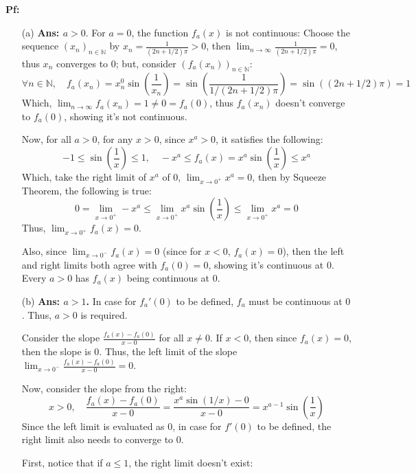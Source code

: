 \documentclass{article}
\begin{document}
\textbf{Pf:}

\begin{itemize}
    \item[(a)] \textbf{Ans: $a>0$}. For $a=0$, the function $f_a(x)$ is not continuous: Choose the sequence $(x_n)_{n\in\mathbb{N}}$ by $x_n=\frac{1}{(2n+1/2)\pi} >0$, 
    then $\lim_{n\rightarrow\infty}\frac{1}{(2n+1/2)\pi}=0$, thus $x_n$ converges to $0$; but, consider $(f_a(x_n))_{n\in\mathbb{N}}$:
    $$\forall n\in\mathbb{N},\quad f_a(x_n) = x_n^0\sin\left(\frac{1}{x_n}\right) = \sin\left(\frac{1}{1/(2n+1/2)\pi}\right) = \sin((2n+1/2)\pi) = 1$$
    Which, $\lim_{n\rightarrow\infty}f_a(x_n) = 1\neq 0 = f_a(0)$, thus $f_a(x_n)$ doesn't converge to $f_a(0)$, showing it's not continuous.
    
    \hfill

    Now, for all $a>0$, for any $x>0$, since $x^a>0$, it satisfies the following:
    $$-1\leq \sin\left(\frac{1}{x}\right)\leq 1,\quad -x^a\leq f_a(x)=x^a\sin\left(\frac{1}{x}\right)\leq x^a$$
    Which, take the right limit of $x^a$ of $0$, $\lim_{x\rightarrow 0^+}x^a=0$, then by Squeeze Theorem, the following is true:
    $$0 =\lim_{x\rightarrow 0^+}-x^a\leq \lim_{x\rightarrow 0^+}x^a\sin\left(\frac{1}{x}\right)\leq \lim_{x\rightarrow 0^+}x^a = 0$$
    Thus, $\lim_{x\rightarrow 0^+}f_a(x)=0$.

    Also, since $\lim_{x\rightarrow 0^-}f_a(x) = 0$ (since for $x<0$, $f_a(x)=0$), then the left and right limits both agree with $f_a(0)=0$, showing it's continuous at $0$.
    Every $a>0$ has $f_a(x)$ being continuous at $0$.
    
    \hfill

    \item[(b)] \textbf{Ans: $a>1$.} In case for $f_a'(0)$ to be defined, $f_a$ must be continuous at $0$. Thus, $a>0$ is required.
    
    Consider the slope $\frac{f_a(x)-f_a(0)}{x-0}$ for all $x\neq 0$.
    If $x<0$, then since $f_a(x)=0$, then the slope is $0$. Thus, the left limit of the slope $\lim_{x\rightarrow 0^-}\frac{f_a(x)-f_a(0)}{x-0} = 0$.

    Now, consider the slope from the right:
    $$x>0,\quad \frac{f_a(x)-f_a(0)}{x-0} = \frac{x^a\sin(1/x)-0}{x-0} = x^{a-1}\sin\left(\frac{1}{x}\right)$$
    Since the left limit is evaluated as $0$, in case for $f'(0)$ to be defined, the right limit also needs to converge to $0$.
    
    \hfill

    First, notice that if $a \leq 1$, the right limit doesn't exist: 


\end{itemize}
\end{document}

